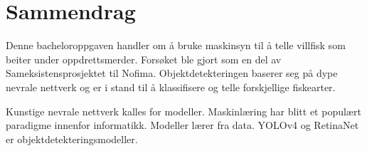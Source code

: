 \section*{Sammendrag}










Denne bacheloroppgaven handler om å bruke maskinsyn til å telle villfisk som beiter under oppdrettsmerder. Forsøket ble gjort som en del av Sameksistensprosjektet til Nofima. Objektdetekteringen baserer seg på dype nevrale nettverk og er i stand til å klassifisere og telle forskjellige fiskearter.

Kunstige nevrale nettverk kalles for modeller. Maskinlæring har blitt et populært paradigme innenfor informatikk. Modeller lærer fra data. YOLOv4 og RetinaNet er objektdetekteringsmodeller.

